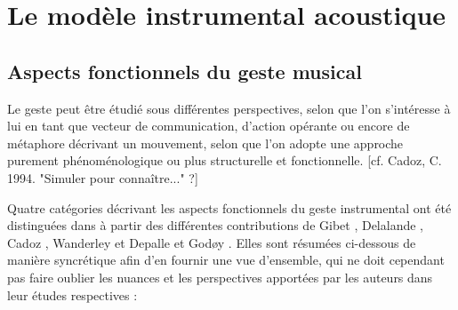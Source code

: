 \section{Le modèle instrumental acoustique}

\subsection{Aspects fonctionnels du geste musical}

Le geste peut être étudié sous différentes perspectives, selon que l'on s'intéresse à lui en tant que vecteur de communication, d'action opérante ou encore de métaphore décrivant un mouvement, selon que l'on adopte une approche purement phénoménologique ou plus structurelle et fonctionnelle. [cf. Cadoz, C. 1994. "Simuler pour connaître..." ?]

Quatre catégories décrivant les aspects fonctionnels du geste instrumental ont été distinguées dans \cite{jensenius_musical_2010} à partir des différentes contributions de Gibet \cite{gibet_codage_1987}, Delalande \cite{delalande_geste_1988}, Cadoz \cite{cadoz_gesture_2000}, Wanderley et Depalle\cite{wanderley_gestural_2004} et Godøy \cite{godoy_exploring_2006}. Elles sont résumées ci-dessous de manière syncrétique afin d'en fournir une vue d'ensemble, qui ne doit cependant pas faire oublier les nuances et les perspectives apportées par les auteurs dans leur études respectives :

